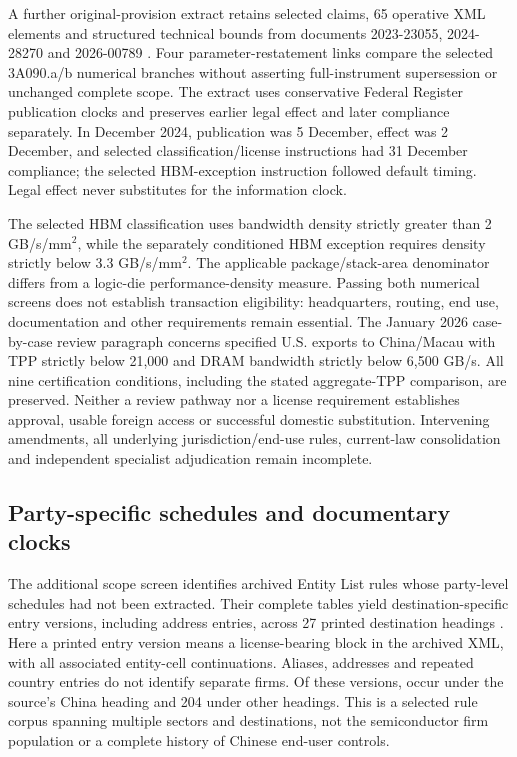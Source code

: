 \documentclass[11pt]{article}
\begin{document}
A further original-provision extract retains \LegalProvisions{} selected claims, 65 operative XML elements and \LegalBounds{} structured technical bounds from documents 2023-23055, 2024-28270 and 2026-00789 \citep{BIS2023Compute,BIS2024HBM,BIS2026}. Four parameter-restatement links compare the selected 3A090.a/b numerical branches without asserting full-instrument supersession or unchanged complete scope. The extract uses conservative Federal Register publication clocks and preserves earlier legal effect and later compliance separately. In December 2024, publication was 5 December, effect was 2 December, and selected classification/license instructions had 31 December compliance; the selected HBM-exception instruction followed default timing. Legal effect never substitutes for the information clock.

The selected HBM classification uses bandwidth density strictly greater than 2 GB/s/mm$^2$, while the separately conditioned HBM exception requires density strictly below 3.3 GB/s/mm$^2$. The applicable package/stack-area denominator differs from a logic-die performance-density measure. Passing both numerical screens does not establish transaction eligibility: headquarters, routing, end use, documentation and other requirements remain essential. The January 2026 case-by-case review paragraph concerns specified U.S. exports to China/Macau with TPP strictly below 21,000 and DRAM bandwidth strictly below 6,500 GB/s. All nine certification conditions, including the stated aggregate-TPP comparison, are preserved. Neither a review pathway nor a license requirement establishes approval, usable foreign access or successful domestic substitution. Intervening amendments, all underlying jurisdiction/end-use rules, current-law consolidation and independent specialist adjudication remain incomplete.

\subsection{Party-specific schedules and documentary clocks}
The additional scope screen identifies \EntityRuleCount{} archived Entity List rules whose party-level schedules had not been extracted. Their complete tables yield \EntityEntryVersions{} destination-specific entry versions, including \EntityAddressEntries{} address entries, across 27 printed destination headings \citep{EL202304558,EL202307840,EL202322536,EL202410485,EL202419130,EL202425411,EL202500480,EL202505427,EL202517893}. Here a printed entry version means a license-bearing block in the archived XML, with all associated entity-cell continuations. Aliases, addresses and repeated country entries do not identify separate firms. Of these versions, \EntityChinaEntries{} occur under the source's China heading and 204 under other headings. This is a selected rule corpus spanning multiple sectors and destinations, not the semiconductor firm population or a complete history of Chinese end-user controls.
\end{document}

